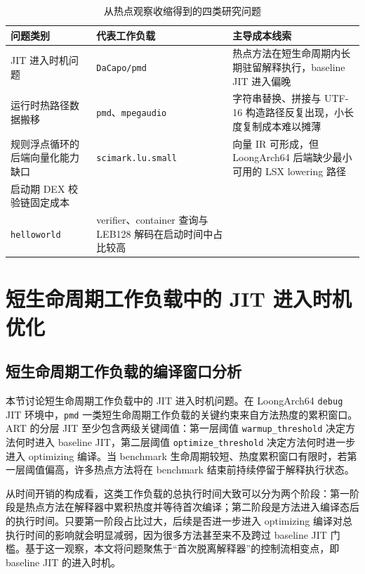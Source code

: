 \begin{table}[htbp]
    \centering
    \small
    \caption{从热点观察收缩得到的四类研究问题}
    \label{tab:problem-modeling-axes}
    \begin{tabular}{>{\raggedright\arraybackslash}p{3.2cm}>{\raggedright\arraybackslash}p{2.8cm}>{\raggedright\arraybackslash}p{5.7cm}}
        \toprule
        \textbf{问题类别} & \textbf{代表工作负载} & \textbf{主导成本线索} \\
        \midrule
        JIT 进入时机问题 & \texttt{DaCapo/pmd} & 热点方法在短生命周期内长期驻留解释执行，baseline JIT 进入偏晚 \\
        运行时热路径数据搬移 & \texttt{pmd}、\texttt{mpegaudio} & 字符串替换、拼接与 UTF-16 构造路径反复出现，小长度复制成本难以摊薄 \\
        规则浮点循环的后端向量化能力缺口 & \texttt{scimark.lu.small} & 向量 IR 可形成，但 LoongArch64 后端缺少最小可用的 LSX lowering 路径 \\
        启动期 DEX 校验链固定成本 & \shortstack[l]{\texttt{startup.}\\\texttt{helloworld}} & verifier、container 查询与 LEB128 解码在启动时间中占比较高 \\
        \bottomrule
    \end{tabular}
\end{table}
\section{短生命周期工作负载中的 JIT 进入时机优化}

\subsection{短生命周期工作负载的编译窗口分析}

本节讨论短生命周期工作负载中的 JIT 进入时机问题。在 LoongArch64 \texttt{debug} JIT 环境中，\texttt{pmd} 一类短生命周期工作负载的关键约束来自方法热度的累积窗口。ART 的分层 JIT 至少包含两级关键阈值：第一层阈值 \texttt{warmup\_threshold} 决定方法何时进入 baseline JIT，第二层阈值 \texttt{optimize\_threshold} 决定方法何时进一步进入 optimizing 编译。当 benchmark 生命周期较短、热度累积窗口有限时，若第一层阈值偏高，许多热点方法将在 benchmark 结束前持续停留于解释执行状态\citep{Arnold2005,ArtJitCompiler2024,Perez2012HybridJIT,Xu2018ShareJIT}。

从时间开销的构成看，这类工作负载的总执行时间大致可以分为两个阶段：第一阶段是热点方法在解释器中累积热度并等待首次编译；第二阶段是方法进入编译态后的执行时间。只要第一阶段占比过大，后续是否进一步进入 optimizing 编译对总执行时间的影响就会明显减弱，因为很多方法甚至来不及跨过 baseline JIT 门槛。基于这一观察，本文将问题聚焦于“首次脱离解释器”的控制流相变点，即 baseline JIT 的进入时机。

